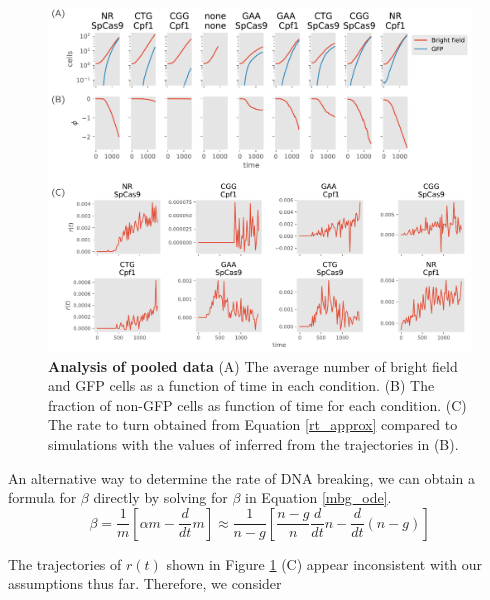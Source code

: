 \documentclass{article}
\begin{document}
\begin{figure}[h!]
\centering
\includegraphics[scale=0.6]{fig1.pdf}
\caption{{\bf Analysis of pooled data} (A) The average number of bright field and GFP cells as a function of time in each condition.  (B) The fraction of non-GFP cells as function of time for each condition.  (C) The rate to turn obtained from Equation \ref{rt_approx} compared to simulations with the values of inferred from the trajectories in (B). }\label{fig:1}
\end{figure}




An alternative way to determine the rate of DNA breaking, we can obtain a formula for $\beta$ directly by solving for $\beta$ in Equation \ref{mbg_ode}. 
\begin{equation}\label{betat}
\beta  = \frac{1}{m}\left[ \alpha m - \frac{d}{dt}m \right] \approx \frac{1}{n-g}\left[  \frac{n-g}{n} \frac{d}{dt}n  - \frac{d}{dt}(n-g) \right]
\end{equation}


The trajectories of $r(t)$ shown in Figure \ref{fig:1} (C) appear inconsistent with our assumptions thus far. Therefore, we consider 
\end{document}
